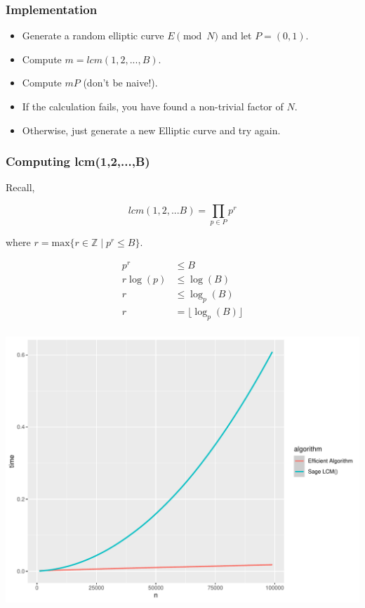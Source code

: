 \documentclass{beamer}
\begin{document}
\begin{frame}
\frametitle{Implementation}

\begin{itemize}
    \item Generate a random elliptic curve $E \pmod{N}$ and let $P = (0,1)$.
    \item Compute $m = lcm(1,2,...,B)$.
    \item Compute $mP$ (don't be naive!).
    \item If the calculation fails, you have found a non-trivial factor of $N$.
    \item Otherwise, just generate a new Elliptic curve and try again.
\end{itemize}

\end{frame}

\begin{frame}
\frametitle{Computing lcm(1,2,...,B)}

Recall,

\[ lcm(1,2,...B) = \prod_{p \in P} p^r \]

where $r = \text{max} \{ r \in \mathbb{Z} \mid p^r \leq B \}$.

\begin{align*}
    p^r &\leq B \\
    r\log(p) &\leq \log(B) \\
    r &\leq \log_p(B) \\
    r &= \lfloor \log_p(B) \rfloor \\
\end{align*}

\end{frame}

\begin{frame}

\includegraphics[width=\textwidth]{graphs/lcm_comparison.pdf}

\end{frame}
\end{document}
